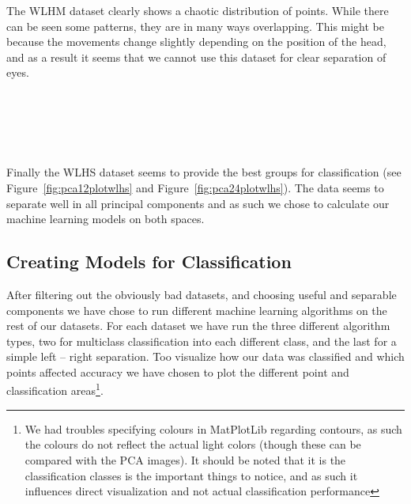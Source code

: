 The WLHM dataset clearly shows a chaotic distribution of points. While there can be seen some patterns, they are in many ways overlapping.
This might be because the movements change slightly depending on the position of the head, and as a result it seems that we cannot use this
dataset for clear separation of eyes.

\begin{minipage}{\linewidth}
  \centering
  \label{fig:pca12plotwlhs}
\end{minipage}\\\\

\begin{minipage}{\linewidth}
  \centering
  \label{fig:pca24plotwlhs}
\end{minipage}\\\\

Finally the WLHS dataset seems to provide the best groups for classification (see Figure~\ref{fig:pca12plotwlhs} and Figure~\ref{fig:pca24plotwlhs}). The data
seems to separate well in all principal components and as such we chose to calculate our machine learning models on both spaces.

\subsection{Creating Models for Classification}
\label{sub:CreatingModelsforClassification}

After filtering out the obviously bad datasets, and choosing useful and separable components we have chose to run different machine learning algorithms 
on the rest of our datasets. For each dataset we have run the three different algorithm types, two for multiclass classification into each different class,
and the last for a simple left -- right separation. Too visualize how our data was classified and which points affected accuracy we have chosen
to plot the different point and classification areas\footnote{We had troubles specifying colours in MatPlotLib regarding contours, as such the colours do not reflect the actual light colors (though these can be compared with the PCA images).
  It should be noted that it is the classification classes is the important things to notice, and as such it influences direct visualization and not actual classification performance}.\\

